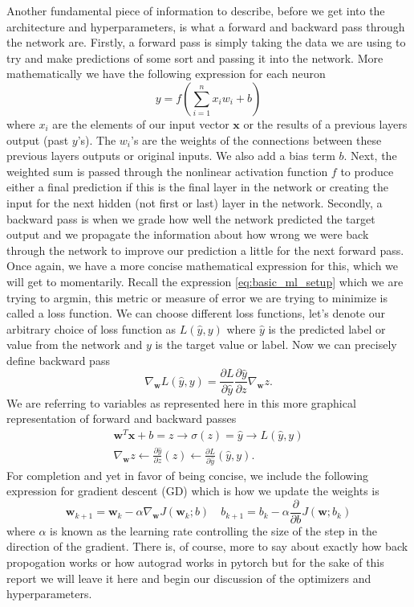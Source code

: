 \documentclass[11pt]{amsart}
\begin{document}
Another fundamental piece of information to describe, before we get into the architecture and hyperparameters, is what a forward and backward pass through the network are.
Firstly, a forward pass is simply taking the data we are using to try and make predictions of some sort and passing it into the network.
More mathematically we have the following expression for each neuron
\begin{equation}
y = f\left( \sum_{i=1}^n x_i w_i + b \right)
\label{eq:neuron_calc}
\end{equation}
where $x_i$ are the elements of our input vector $\bm x$  or the results of a previous layers output (past $y$'s).
The $w_i$'s are the weights of the connections between these previous layers outputs or original inputs.
We also add a bias term $b$.
Next, the weighted sum is passed through the nonlinear activation function $f$ to produce either a final prediction if this is the final layer in the network or creating the input for the next hidden (not first or last) layer in the network.
Secondly, a backward pass is when we grade how well the network predicted the target output and we propagate the information about how wrong we were back through the network to improve our prediction a little for the next forward pass.
Once again, we have a more concise mathematical expression for this, which we will get to momentarily.
Recall the expression \eqref{eq:basic_ml_setup} which we are trying to argmin, this metric or measure of error we are trying to minimize is called a loss function.
We can choose different loss functions, let's denote our arbitrary choice of loss function as $L(\hat y, y)$ where $\hat y$ is the predicted label or value from the network and $y$ is the target value or label.
Now we can precisely define backward pass
\begin{equation}
\nabla_{\bm w} L(\hat y, y) = \frac {\partial L}{\partial \hat y} \frac {\partial \hat y}{\partial z} \nabla_{\bm w} z.
\label{eq:back_prop}
\end{equation}
We are referring to variables as represented here in this more graphical representation of forward and backward passes
\begin{align*}
\boxed{\bm w^T \bm x + b = z} \rightarrow \boxed{\sigma(z) = \hat y} \rightarrow \boxed{L(\hat y , y)} \\
\boxed{\nabla_{\bm w} z} \leftarrow \boxed{\frac {\partial \hat y}{\partial z} (z)} \leftarrow \boxed{\frac {\partial L}{\partial \hat y}(\hat y , y)}.
\end{align*}
For completion and yet in favor of being concise, we include the following expression for gradient descent (GD) which is how we update the weights is
\begin{equation}
\bm w_{k + 1} = \bm w_{k} - \alpha \nabla_{\bm w} J(\bm w_{k}; b) \quad
b_{k + 1} = b_{k} - \alpha \frac \partial {\partial b}J(\bm w; b_k)
\label{eq:gd}
\end{equation}
where $\alpha$ is known as the learning rate controlling the size of the step in the direction of the gradient.
There is, of course, more to say about exactly how back propogation works or how autograd works in pytorch but for the sake of this report we will leave it here and begin our discussion of the optimizers and hyperparameters.
\end{document}
